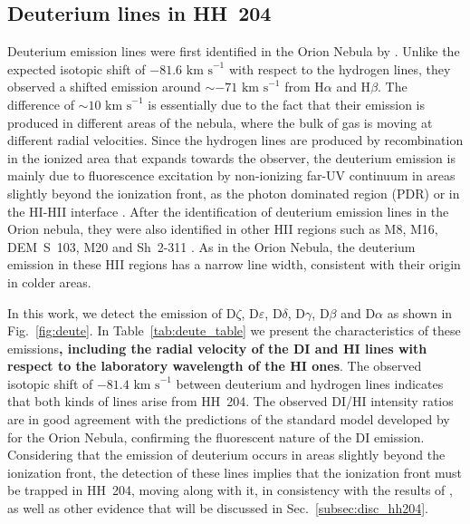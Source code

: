 \documentclass[twocolumn,linenumbers]{aastex63}
\begin{document}
\subsection{Deuterium lines in HH~204}
\label{subsec:deuterium}


Deuterium emission lines were first identified in the Orion Nebula by \citet[][]{hebrard00a}. Unlike the expected isotopic shift of $-81.6 \text{ km s}^{-1}$ with respect to the hydrogen lines, they observed a shifted emission around $\sim -71 \text{ km s}^{-1}$ from H$\alpha$ and H$\beta$. The difference of $\sim 10 \text{ km s}^{-1}$ is essentially due to the fact that their emission is produced in different areas of the nebula, where the bulk of gas is moving at different radial velocities. Since the hydrogen lines are produced by recombination in the ionized area that expands towards the observer, the deuterium emission is  mainly due to fluorescence excitation by non-ionizing far-UV continuum in areas slightly beyond the ionization front, as the photon dominated region (PDR) or in the H\thinspace I-H\thinspace II interface \citep[][]{odell01_deu}. After the identification of deuterium emission lines in the Orion nebula, they were also identified in other H\thinspace II regions such as M8, M16, DEM~S~103, M20 and Sh~2-311 \citep[][]{hebrard00b,garciarojas05,garciarojas06,garciarojas07-2}. As in the Orion Nebula, the deuterium emission in these H\thinspace II regions has a narrow line width, consistent with their origin in colder areas.

In this work, we detect the emission of D$\zeta$, D$\varepsilon$, D$\delta$, D$\gamma$, D$\beta$ and D$\alpha$ as shown in Fig.~\ref{fig:deute}. In Table~\ref{tab:deute_table} we present the characteristics of these emissions{\bf, including the radial velocity of the D\thinspace I and H\thinspace I lines with respect to the laboratory wavelength of the H\thinspace I ones}. The observed isotopic shift of $-81.4 \text{ km s}^{-1}$ between deuterium and hydrogen lines indicates that both kinds of lines arise from HH~204. The observed D\thinspace I/H\thinspace I intensity ratios are in good agreement with the predictions of the standard model developed by \citet[][]{odell01_deu} for the Orion Nebula, confirming the fluorescent nature of the D\thinspace I emission. Considering that the emission of deuterium occurs in areas slightly beyond the ionization front, the detection of these lines implies that the ionization front must be trapped in HH~204, moving along with it, in consistency with the results of \citet[][]{nunezdiaz12}, as well as other evidence that will be discussed in Sec.~\ref{subsec:disc_hh204}. 
\end{document}
